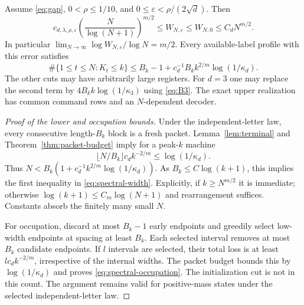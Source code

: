 \begin{theorem}\label{thm:spectral}
Assume \eqref{eq:gap}, $0<\rho\le1/10$, and
$0\le\varepsilon<\rho/(2\sqrt d)$. Then
\begin{equation}\label{eq:spectral-width}
 c_{d,\lambda,\rho,\varepsilon}
 \left(\frac N{\log(N+1)}\right)^{m/2}
 \le W_{N,\varepsilon}\le W_{N,0}\le C_d N^{m/2}.
\end{equation}
In particular $\lim_{N\to\infty}\log W_{N,\varepsilon}/\log N=m/2$.
Every available-label profile with this error satisfies
\begin{equation}\label{eq:spectral-occupation}
 \#\{1\le t\le N:K_t\le k\}
 \le B_k-1+c_d^{-1}B_k k^{2/m}\log(1/\kappa_d).
\end{equation}
The other cuts may have arbitrarily large registers. For $d=3$ one may
replace the second term by $4B_k k\log(1/\kappa_3)$ using \eqref{eq:B3}.
The exact upper realization has common command rows and an
$N$-dependent decoder.
\end{theorem}
\begin{proof}[Proof of the lower and occupation bounds]
Under the independent-letter law, every consecutive length-$B_k$ block
is a fresh packet. Lemma~\ref{lem:terminal} and
Theorem~\ref{thm:packet-budget} imply for a peak-$k$ machine
\begin{equation}\label{eq:gap-finite}
 \lfloor N/B_k\rfloor c_d k^{-2/m}\le\log(1/\kappa_d).
\end{equation}
Thus $N<B_k(1+c_d^{-1}k^{2/m}\log(1/\kappa_d))$.
As $B_k\le C\log(k+1)$, this implies the first inequality in
\eqref{eq:spectral-width}. Explicitly, if $k\ge N^{m/2}$ it is
immediate; otherwise $\log(k+1)\le C_m\log(N+1)$ and rearrangement
suffices. Constants absorb the finitely many small $N$.

For occupation, discard at most $B_k-1$ early endpoints and greedily
select low-width endpoints at spacing at least $B_k$. Each selected
interval removes at most $B_k$ candidate endpoints. If $l$ intervals
are selected, their total loss is at least $lc_dk^{-2/m}$, irrespective
of the internal widths. The packet budget bounds this by
$\log(1/\kappa_d)$ and proves \eqref{eq:spectral-occupation}.
The initialization cut is not in this count. The argument remains
valid for positive-mass states under the selected independent-letter law.
\end{proof}

